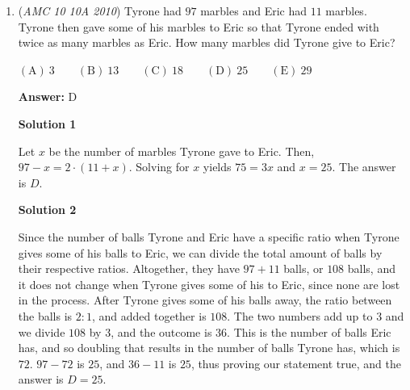 \begin{enumerate}
We can say the area of one small square is $x^2$, so $\dfrac{1}{4}$ of the area of the large square is $4x^2$ so the area of the large square is $16x^2$, so each side is $4x$ so the length of the rectangle is $4x$ and the width of the rectangle is also $4x$. $4x-x=3x$ so $\dfrac{4x}{3x}=\dfrac{4}{3}$.

 



\textbf{Solution 3}

Let the side length of one of the squares equal $1$. Then, the width of the rectangle will be $4$, and since the width of the rectangle is the same as the length of the entire shape, the length of the rectangle is $4 - 1 = 3$. The ratio between the two is therefore $\frac{4}{3}$ , so our answer is $\boxed{B}$. 

 


	\item (\textit{AMC 10 10A 2010}) Tyrone had $97$ marbles and Eric had $11$ marbles. Tyrone then gave some of his marbles to Eric so that Tyrone ended with twice as many marbles as Eric. How many marbles did Tyrone give to Eric?


 $\mathrm{(A)}\ 3 \qquad \mathrm{(B)}\ 13 \qquad \mathrm{(C)}\ 18 \qquad \mathrm{(D)}\ 25 \qquad \mathrm{(E)}\ 29$

 \textbf{Answer: }D



\textbf{Solution 1}

Let $x$ be the number of marbles Tyrone gave to Eric. Then, $97-x = 2\cdot(11+x)$. Solving for $x$ yields $75=3x$ and $x = 25$. The answer is $\boxed{D}$.

 


 



\textbf{Solution 2}

Since the number of balls Tyrone and Eric have a specific ratio when Tyrone gives some of his balls to Eric, we can divide the total amount of balls by their respective ratios. Altogether, they have $97+11$ balls, or $108$ balls, and it does not change when Tyrone gives some of his to Eric, since none are lost in the process. After Tyrone gives some of his balls away, the ratio between the balls is $2:1$, and added together is $108$. The two numbers add up to $3$ and we divide $108$ by $3$, and the outcome is $36$. This is the number of balls Eric has, and so doubling that results in the number of balls Tyrone has, which is $72$. $97-72$ is $25$, and $36-11$ is $25$, thus proving our statement true, and the answer is $\boxed{D=25}$.


\end{enumerate}
